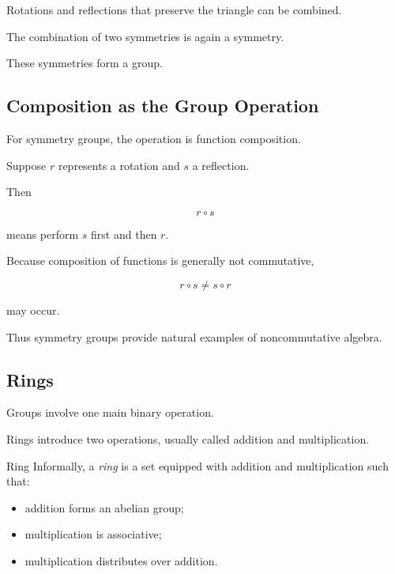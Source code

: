 Rotations and reflections that preserve the triangle can be combined.

The combination of two symmetries is again a symmetry.

These symmetries form a group.

\subsection{Composition as the Group Operation}
\label{subsec:symmetry-composition}

For symmetry groups, the operation is function composition.

Suppose \(r\) represents a rotation and \(s\) a reflection.

Then

\[ r\circ s \]

means perform \(s\) first and then \(r\).

Because composition of functions is generally not commutative,

\[ r\circ s\neq s\circ r \]

may occur.

Thus symmetry groups provide natural examples of noncommutative algebra.

\subsection{Rings}
\label{subsec:rings-overview}

Groups involve one main binary operation.

Rings introduce two operations, usually called addition and multiplication.

\begin{definitionbox}{Ring}
Informally, a \emph{ring} is a set equipped with addition and multiplication
such that:
\begin{itemize}
    \item addition forms an abelian group;
    \item multiplication is associative;
    \item multiplication distributes over addition.
\end{itemize}
\end{definitionbox}

